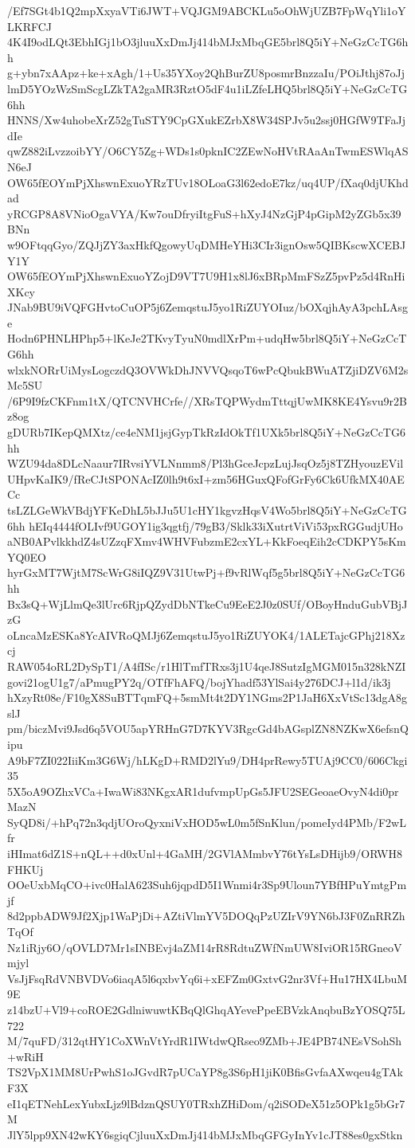 /Ef7SGt4b1Q2mpXxyaVTi6JWT+VQJGM9ABCKLu5oOhWjUZB7FpWqYli1oYLKRFCJ
4K4I9odLQt3EbhIGj1bO3jluuXxDmJj414bMJxMbqGE5brl8Q5iY+NeGzCcTG6hh
g+ybn7xAApz+ke+xAgh/1+Us35YXoy2QhBurZU8posmrBnzzaIu/POiJthj87oJj
lmD5YOzWzSmScgLZkTA2gaMR3RztO5dF4u1iLZfeLHQ5brl8Q5iY+NeGzCcTG6hh
HNNS/Xw4uhobeXrZ52gTuSTY9CpGXukEZrbX8W34SPJv5u2ssj0HGfW9TFaJjdIe
qwZ882iLvzzoibYY/O6CY5Zg+WDs1s0pknIC2ZEwNoHVtRAaAnTwmESWlqASN6eJ
OW65fEOYmPjXhswnExuoYRzTUv18OLoaG3l62edoE7kz/uq4UP/fXaq0djUKhdad
yRCGP8A8VNioOgaVYA/Kw7ouDfryiItgFuS+hXyJ4NzGjP4pGipM2yZGb5x39BNn
w9OFtqqGyo/ZQJjZY3axHkfQgowyUqDMHeYHi3CIr3ignOsw5QIBKscwXCEBJY1Y
OW65fEOYmPjXhswnExuoYZojD9VT7U9H1x8lJ6xBRpMmFSzZ5pvPz5d4RnHiXKcy
JNab9BU9iVQFGHvtoCuOP5j6ZemqstuJ5yo1RiZUYOIuz/bOXqjhAyA3pchLAsge
Hodn6PHNLHPhp5+lKeJe2TKvyTyuN0mdlXrPm+udqHw5brl8Q5iY+NeGzCcTG6hh
wlxkNORrUiMysLogczdQ3OVWkDhJNVVQsqoT6wPcQbukBWuATZjiDZV6M2sMc5SU
/6P9I9fzCKFnm1tX/QTCNVHCrfe//XRsTQPWydmTttqjUwMK8KE4Ysvu9r2Bz8og
gDURb7IKepQMXtz/ce4eNM1jsjGypTkRzIdOkTf1UXk5brl8Q5iY+NeGzCcTG6hh
WZU94da8DLcNaaur7IRvsiYVLNnmm8/Pl3hGceJcpzLujJsqOz5j8TZHyouzEVil
UHpvKaIK9/fReCJtSPONAcIZ0lh9t6xI+zm56HGuxQFofGrFy6Ck6UfkMX40AECc
tsLZLGeWkVBdjYFKeDhL5bJJu5U1cHY1kgvzHqsV4Wo5brl8Q5iY+NeGzCcTG6hh
hEIq4444fOLIvf9UGOY1ig3qgtfj/79gB3/Sklk33iXutrtViVi53pxRGGudjUHo
aNB0APvlkkhdZ4sUZzqFXmv4WHVFubzmE2cxYL+KkFoeqEih2cCDKPY5sKmYQ0EO
hyrGxMT7WjtM7ScWrG8iIQZ9V31UtwPj+f9vRlWqf5g5brl8Q5iY+NeGzCcTG6hh
Bx3sQ+WjLlmQe3lUrc6RjpQZydDbNTkeCu9EeE2J0z0SUf/OBoyHnduGubVBjJzG
oLncaMzESKa8YcAIVRoQMJj6ZemqstuJ5yo1RiZUYOK4/1ALETajcGPhj218Xzcj
RAW054oRL2DySpT1/A4fISc/r1HlTmfTRxs3j1U4qeJ8SutzIgMGM015n328kNZI
govi21ogU1g7/aPmugPY2q/OTfFhAFQ/bojYhadf53YlSai4y276DCJ+l1d/ik3j
hXzyRt08e/F10gX8SuBTTqmFQ+5smMt4t2DY1NGms2P1JaH6XxVtSc13dgA8gslJ
pm/biczMvi9Jsd6q5VOU5apYRHnG7D7KYV3RgcGd4bAGsplZN8NZKwX6efsnQipu
A9bF7ZI022IiiKm3G6Wj/hLKgD+RMD2lYu9/DH4prRewy5TUAj9CC0/606Ckgi35
5X5oA9OZhxVCa+IwaWi83NKgxAR1dufvmpUpGs5JFU2SEGeoaeOvyN4di0prMazN
SyQD8i/+hPq72n3qdjUOroQyxniVxHOD5wL0m5fSnKlun/pomeIyd4PMb/F2wLfr
iHImat6dZ1S+nQL++d0xUnl+4GaMH/2GVlAMmbvY76tYsLsDHijb9/ORWH8FHKUj
OOeUxbMqCO+ivc0HalA623Suh6jqpdD5I1Wnmi4r3Sp9Uloun7YBfHPuYmtgPmjf
8d2ppbADW9Jf2Xjp1WaPjDi+AZtiVlmYV5DOQqPzUZIrV9YN6bJ3F0ZnRRZhTqOf
Nz1iRjy6O/qOVLD7Mr1sINBEvj4aZM14rR8RdtuZWfNmUW8IviOR15RGneoVmjyl
VsJjFsqRdVNBVDVo6iaqA5l6qxbvYq6i+xEFZm0GxtvG2nr3Vf+Hu17HX4LbuM9E
z14bzU+Vl9+coROE2GdlniwuwtKBqQlGhqAYevePpeEBVzkAnqbuBzYOSQ75L722
M/7quFD/312qtHY1CoXWnVtYrdR1IWtdwQRseo9ZMb+JE4PB74NEsVSohSh+wRiH
TS2VpX1MM8UrPwhS1oJGvdR7pUCaYP8g3S6pH1jiK0BfisGvfaAXwqeu4gTAkF3X
eI1qETNehLexYubxLjz9lBdznQSUY0TRxhZHiDom/q2iSODeX51z5OPk1g5bGr7M
JlY5lpp9XN42wKY6sgiqCjluuXxDmJj414bMJxMbqGFGyInYv1cJT88es0gxStkn
